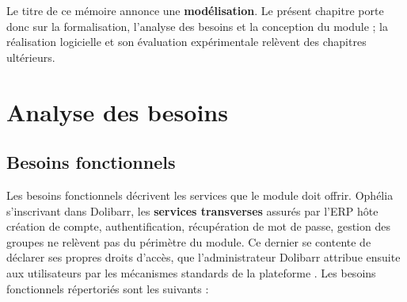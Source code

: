 Le titre de ce mémoire annonce une \textbf{modélisation}. Le présent chapitre porte donc sur
la formalisation, l'analyse des besoins et la conception du module ; la réalisation logicielle
et son évaluation expérimentale relèvent des chapitres ultérieurs.

\section{Analyse des besoins}
\label{sec:analyse-besoins}

\subsection{Besoins fonctionnels}
\label{subsec:besoins-fonctionnels}

Les besoins fonctionnels décrivent les services que le module doit offrir. Ophélia
s'inscrivant dans Dolibarr, les \textbf{services transverses} assurés par l'ERP hôte 
création de compte, authentification, récupération de mot de passe, gestion des groupes  ne
relèvent pas du périmètre du module. Ce dernier se contente de déclarer ses propres droits
d'accès, que l'administrateur Dolibarr attribue ensuite aux utilisateurs par les mécanismes
standards de la plateforme \cite{dolibarr2025devguide}. Les besoins fonctionnels répertoriés
sont les suivants :

